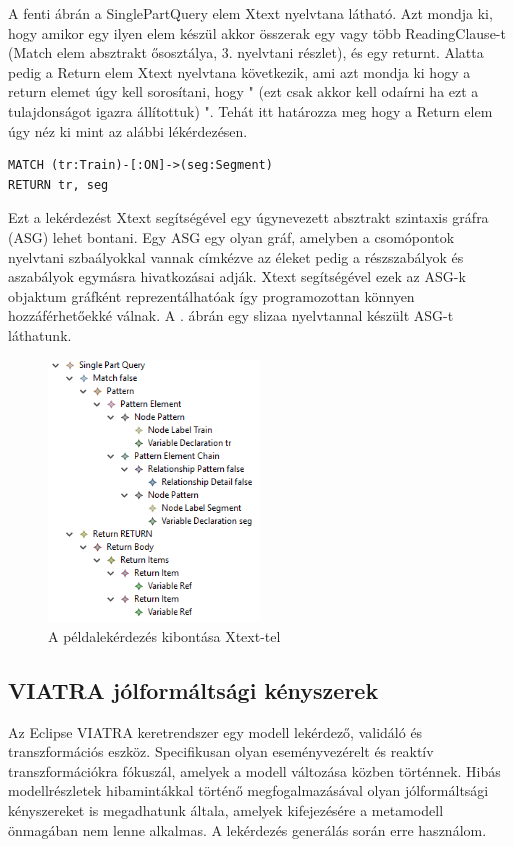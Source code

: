 A fenti ábrán a SinglePartQuery elem Xtext nyelvtana látható. Azt mondja ki,
hogy amikor egy ilyen elem készül akkor összerak egy vagy több ReadingClause-t (Match elem absztrakt ősosztálya, 3. nyelvtani részlet),
és egy returnt. Alatta pedig a Return elem Xtext nyelvtana következik, ami azt mondja ki hogy a return
elemet úgy kell sorosítani, hogy " (ezt csak akkor kell odaírni ha ezt a tulajdonságot igazra
állítottuk) ". Tehát itt határozza meg hogy a Return elem úgy néz ki  mint az alábbi lékérdezésen.

\begin{lstlisting}[style=cyphersmall]
MATCH (tr:Train)-[:ON]->(seg:Segment)
RETURN tr, seg	
\end{lstlisting} 

Ezt a lekérdezést Xtext segítségével egy úgynevezett absztrakt szintaxis gráfra (ASG) lehet bontani. Egy ASG egy olyan gráf, amelyben a csomópontok nyelvtani szbaályokkal vannak címkézve az éleket pedig a részszabályok és aszabályok egymásra hivatkozásai adják. Xtext segítségével ezek az ASG-k objaktum gráfként reprezentálhatóak így programozottan könnyen hozzáférhetőekké válnak. A .  ábrán egy slizaa nyelvtannal készült ASG-t láthatunk.

\begin{figure}
	\centering
	\includegraphics[width=0.5\textwidth]{figures/Xtextelkibontotthellowolrd}
	\caption{A példalekérdezés kibontása Xtext-tel}
	\label{fig:Xtexttelkibontotthelloworld}
\end{figure}


\subsection{\textsc{VIATRA} jólformáltsági kényszerek}
Az Eclipse  \textsc{VIATRA} keretrendszer \cite{viatra} egy modell lekérdező, validáló és transzformációs eszköz. Specifikusan olyan eseményvezérelt
és reaktív transzformációkra fókuszál, amelyek a modell változása közben történnek.  Hibás modellrészletek hibamintákkal történő megfogalmazásával olyan jólformáltsági kényszereket is megadhatunk általa, amelyek kifejezésére a metamodell önmagában nem lenne alkalmas. A lekérdezés generálás során erre használom.


